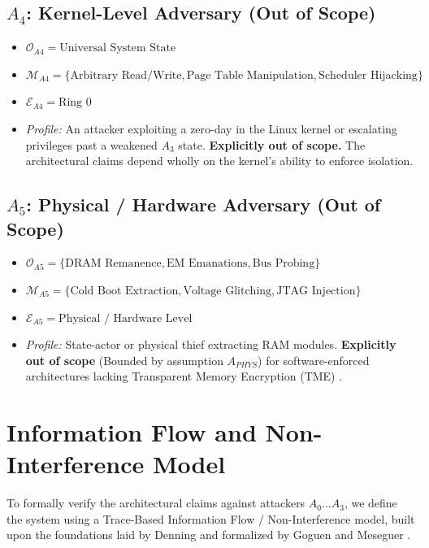 \documentclass[conference]{IEEEtran}
\begin{document}
\subsection{$A_4$: Kernel-Level Adversary (Out of Scope)}
\begin{itemize}
    \item $\mathcal{O}_{A4} = \text{Universal System State}$
    \item $\mathcal{M}_{A4} = \{ \text{Arbitrary Read/Write}, \text{Page Table Manipulation}, \text{Scheduler Hijacking} \}$
    \item $\mathcal{E}_{A4} = \text{Ring 0}$
    \item \textit{Profile:} An attacker exploiting a zero-day in the Linux kernel or escalating privileges past a weakened $A_3$ state. \textbf{Explicitly out of scope.} The architectural claims depend wholly on the kernel's ability to enforce isolation.
\end{itemize}

\subsection{$A_5$: Physical / Hardware Adversary (Out of Scope)}
\begin{itemize}
    \item $\mathcal{O}_{A5} = \{ \text{DRAM Remanence}, \text{EM Emanations}, \text{Bus Probing} \}$
    \item $\mathcal{M}_{A5} = \{ \text{Cold Boot Extraction}, \text{Voltage Glitching}, \text{JTAG Injection} \}$
    \item $\mathcal{E}_{A5} = \text{Physical / Hardware Level}$
    \item \textit{Profile:} State-actor or physical thief extracting RAM modules. \textbf{Explicitly out of scope} (Bounded by assumption $A_{PHYS}$) for software-enforced architectures lacking Transparent Memory Encryption (TME) \cite{b4}.
\end{itemize}

\section{Information Flow and Non-Interference Model}
To formally verify the architectural claims against attackers $A_0 \dots A_3$, we define the system using a Trace-Based Information Flow / Non-Interference model, built upon the foundations laid by Denning \cite{b12} and formalized by Goguen and Meseguer \cite{b8}.
\end{document}
